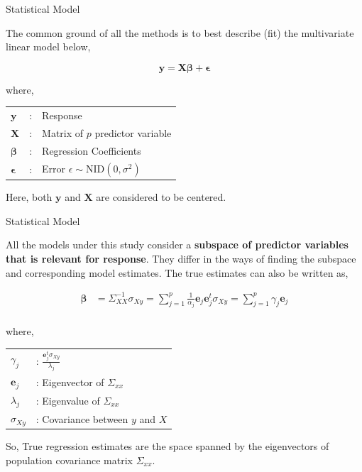 \documentclass[ignorenonframetext,]{beamer}
\begin{document}
\begin{frame}{Statistical Model}

The common ground of all the methods is to best describe (fit) the
multivariate linear model below,

\begin{equation}
\boldsymbol{y} = \boldsymbol{X}\boldsymbol{\beta} + \boldsymbol{\epsilon}
\label{eq:model}
\end{equation}

where,

\begin{longtable}[]{@{}lll@{}}
\toprule
\(\boldsymbol{y}\) & : & Response\tabularnewline
\(\boldsymbol{X}\) & : & Matrix of \(p\) predictor
variable\tabularnewline
\(\boldsymbol{\beta}\) & : & Regression Coefficients\tabularnewline
\(\boldsymbol{\epsilon}\) & : & Error
\(\epsilon \sim \text{NID}(0, \sigma^2)\)\tabularnewline
\bottomrule
\end{longtable}

Here, both \(\boldsymbol{y}\) and \(\boldsymbol{X}\) are considered to
be centered.

\end{frame}

\begin{frame}{Statistical Model}

All the models under this study consider a \textbf{subspace of predictor
variables that is relevant for response}. They differ in the ways of
finding the subspace and corresponding model estimates. The true
estimates can also be written as,

\[
\begin{aligned}
\boldsymbol{\beta} &= \Sigma_{XX}^{-1}\sigma_{Xy} = \sum_{j=1}^p \frac{1}{\alpha_j}\boldsymbol{e}_j\boldsymbol{e}_j^t\sigma_{Xy}
= \sum_{j=1}^p\gamma_j\boldsymbol{e}_j\\
\end{aligned}
\]

where,

\begin{longtable}[]{@{}ll@{}}
\toprule
\(\gamma_j\) & :
\(\frac{\boldsymbol{e}_j^t\sigma_{Xy}}{\lambda_j}\)\tabularnewline
\(\boldsymbol{e}_j\) & : Eigenvector of \(\Sigma_{xx}\)\tabularnewline
\(\lambda_j\) & : Eigenvalue of \(\Sigma_{xx}\)\tabularnewline
\(\sigma_{Xy}\) & : Covariance between \(y\) and \(X\)\tabularnewline
\bottomrule
\end{longtable}

So, True regression estimates are the space spanned by the eigenvectors
of population covariance matrix \(\Sigma_{xx}\).

\end{frame}
\end{document}
